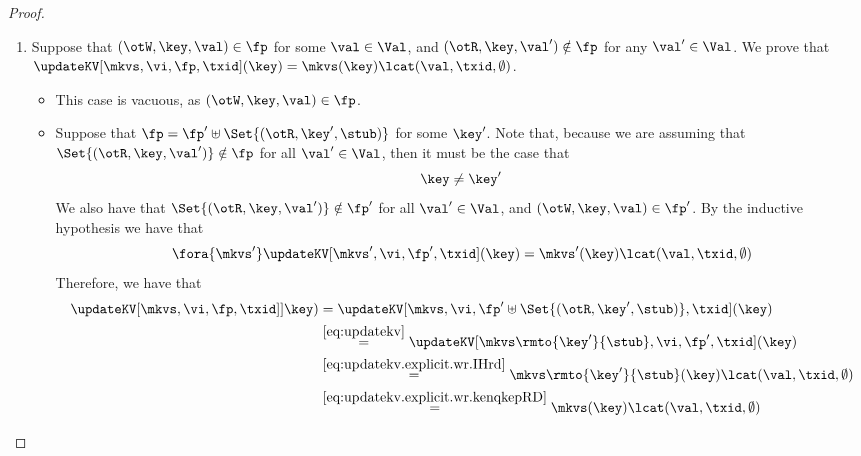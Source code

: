 \begin{proof}
\begin{enumerate}
	\item Suppose that $(\otW, \key, \val) \in \fp$ for some $\val \in \Val$, and 
	$(\otR, \key, \val') \notin \fp$ for any $\val' \in \Val$. We prove that 
	$\updateKV[\mkvs, \vi, \fp, \txid](\key) = \mkvs(\key) \lcat (\val, \txid, \emptyset)$. 
		\begin{itemize}
        \item \caseB{$\fp = \emptyset$} This case is vacuous, as $(\otW, \key, \val) \in \fp$.
		\item Suppose that $\fp = \fp' \uplus \Set{(\otR, \key', \stub)}$ for some 
		$\key'$. Note that, because we are assuming that $\Set{(\otR, \key, \val')} \notin \fp$ 
		for all $\val' \in \Val$, then it must be the case that 
		\begin{equation}
		\key \neq \key'
		\label{eq:updatekv.explicit.wr.kenqkepRD}
		\end{equation}	
		We also have that $\Set{(\otR, \key, \val')} \notin \fp'$ for all $\val' \in \Val$, and 
		$(\otW, \key, \val) \in \fp'$. By the inductive hypothesis we have that 
		\begin{equation}
        \fora{\mkvs'} \updateKV[\mkvs', \vi, \fp', \txid](\key) = \mkvs'(\key) \lcat (\val, \txid, \emptyset)
		\label{eq:updatekv.explicit.wr.IHrd}
		\end{equation}
		Therefore, we have that 
        \begin{align*}
		    \updateKV[\mkvs, \vi, \fp, \txid]]\key) 
            & = 
            \updateKV[\mkvs, \vi, \fp' \uplus \Set{(\otR, \key', \stub)}, \txid](\key) \\
            & \stackrel{\cref{eq:updatekv}}{=}
		    \updateKV[\mkvs\rmto{\key'}{\stub}, \vi, \fp',\txid ](\key) \\
            & \stackrel{\cref{eq:updatekv.explicit.wr.IHrd}}{=} 
            \mkvs\rmto{\key'}{\stub}(\key) \lcat (\val, \txid, \emptyset) \\
            & \stackrel{\cref{eq:updatekv.explicit.wr.kenqkepRD}}{=} 
		    \mkvs(\key) \lcat (\val, \txid, \emptyset)
		\end{align*}
		

\end{itemize}
\end{enumerate}
\end{proof}
